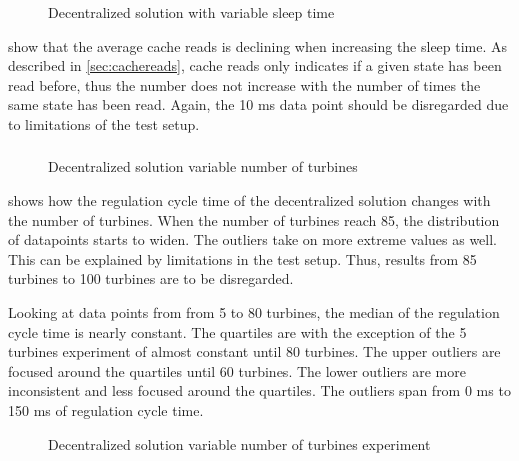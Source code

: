 \begin{figure}[h!]
	\centering
	
	\caption{Decentralized solution with variable sleep time}
	\label{fig:exp:decen:sleep-cache}
\end{figure}

\FloatBarrier

 show that the average cache reads is declining when increasing the sleep time. As described in \cref{sec:cachereads}, cache reads only indicates if a given state has been read before, thus the number does not increase with the number of times the same state has been read. Again, the 10 ms data point should be disregarded due to limitations of the test setup.

\clearpage
\subsubsection{}

\begin{figure}[h!]
	\centering
%	
	
	
	\caption{Decentralized solution variable number of turbines}
	\label{fig:exp:decen:turbines}
\end{figure}

 shows how the regulation cycle time of the decentralized solution changes with the number of turbines.
When the number of turbines reach 85, the distribution of datapoints starts to widen. The outliers take on more extreme values as well. This can be explained by limitations in the test setup. Thus, results from 85 turbines to 100 turbines are to be disregarded.

Looking at data points from from 5 to 80 turbines, the median of the regulation cycle time is nearly constant.
The quartiles are with the exception of the 5 turbines experiment of almost constant until 80 turbines. The upper outliers are focused around the quartiles until 60 turbines. The lower outliers are more inconsistent and less focused around the quartiles.
The outliers span from 0 ms to 150 ms of regulation cycle time.

\begin{figure}[h!]
	\centering
	
	\caption{Decentralized solution variable number of turbines experiment}
	\label{fig:exp:decen:turbines_cache}
\end{figure}


